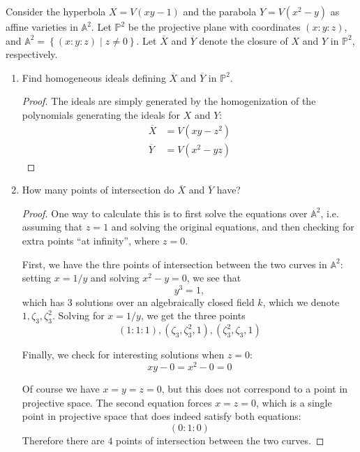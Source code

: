 \documentclass[12pt]{article}
\theoremstyle{definition}
\newenvironment{problem}[2][Problem]{\begin{trivlist}
\item[\hskip \labelsep {\bfseries #1}\hskip \labelsep {\bfseries #2.}]}{\end{trivlist}}
\begin{document}
\begin{problem}{5}
    Consider the hyperbola $X = V(xy - 1)$ and the parabola $Y=V(x^2 - y)$ as affine varieties in $\mathbb A^2$. Let $\mathbb P^2$ be the projective plane with coordinates $(x:y:z)$, and $\mathbb A^2 = \left\{ (x:y:z) \mid z \neq 0 \right\}$. Let $\overline X$ and $\overline Y$ denote the closure of $X$ and $Y$ in $\mathbb P^2$, respectively.
    \begin{enumerate}[label=(\alph*)]
        \item Find homogeneous ideals defining $\overline X$ and $\overline Y$ in $\mathbb P^2$.
            \begin{proof}
                The ideals are simply generated by the homogenization of the polynomials generating the ideals for $X$ and $Y$:
                \begin{align*}
                    \overline X &= V(xy - z^2)\\
                    \overline Y &= V(x^2 - yz)
                \end{align*}
            \end{proof}
        \item How many points of intersection do $\overline X$ and $\overline Y$ have?
            \begin{proof}
                One way to calculate this is to first solve the equations over $\mathbb A^2$, i.e. assuming that $z = 1$ and solving the original equations, and then checking for extra points ``at infinity'', where $z=0$.
                \par First, we have the thre points of intersection between the two curves in $\mathbb A^2$: setting $x = 1/y$ and solving $x^2 - y = 0$, we see that 
                \[ y^3 = 1,\]
                which has $3$ solutions over an algebraically closed field $k$, which we denote $1, \zeta_3, \zeta_3^2$. Solving for $x = 1/y$, we get the three points
                \[(1:1:1), (\zeta_3, \zeta_3^2, 1), (\zeta_3^2, \zeta_3, 1)\]
                \par Finally, we check for interesting solutions when $z = 0$:
                \[xy - 0 = x^2 - 0 = 0\]
                \par Of course we have $x = y= z = 0$, but this does not correspond to a point in projective space. The second equation forces $x = z =0$, which is a single point in projective space that does indeed satisfy both equations:
                \[(0:1:0)\]
                Therefore there are $4$ points of intersection between the two curves.

\end{proof}
\end{enumerate}
\end{problem}
\end{document}
